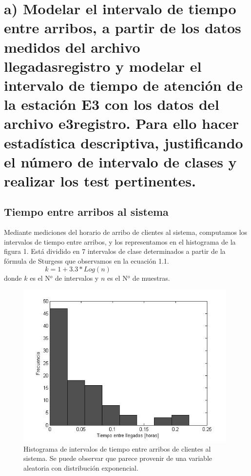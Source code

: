 \documentclass{article}
\numberwithin{equation}{section}
\numberwithin{figure}{section}
\numberwithin{table}{section}
\begin{document}
%
%
\setcounter{page}{1}

%
%
\tableofcontents
\newpage

%
%

\newpage


\section*{a)   Modelar el intervalo de tiempo entre arribos, a partir de los datos medidos del archivo
llegadasregistro y modelar el intervalo de tiempo de atenci\'on de la estaci\'on E3 con los
datos del archivo e3registro. Para ello hacer estad\'istica descriptiva, justificando el n\'umero
de intervalo de clases y realizar los test pertinentes.
}

\subsection*{Tiempo entre arribos al sistema}
Mediante mediciones del horario de arribo de clientes al sistema, computamos
los intervalos de tiempo entre arribos, y los representamos en el histograma
de la figura 1. Est\'a dividido en 7 intervalos de clase determinados a partir
de la f\'ormula de Sturgess que observamos en la ecuaci\'on 1.1.
\begin{equation}
 k = 1 + 3.3 * Log(n)  \hspace{6cm} 
\end{equation}
donde $k$ es el N$^o$ de intervalos y $n$ es el N$^o$ de muestras.

\begin{figure}
\begin{center}
\includegraphics[width=11cm]{histograma_llegadas}
\caption{Histograma de intervalos de tiempo entre arribos de clientes al sistema. Se puede observar que parece provenir de una variable aleatoria con distribuci\'on exponencial.}
\end{center}
\end{figure}
\end{document}
